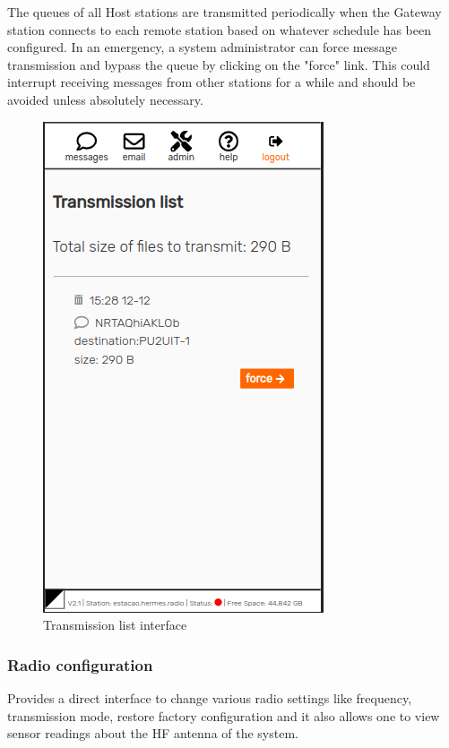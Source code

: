 \documentclass[11pt,a4paper]{article}
\begin{document}
The queues of all Host stations are transmitted periodically when the Gateway station connects to each remote station based on whatever schedule has been configured. In an emergency, a system administrator can force message transmission and bypass the queue by clicking on the "force" link. This could interrupt receiving messages from other stations for a while and should be avoided unless absolutely necessary.   
    \begin{figure}[H]
    \centering
    \includegraphics[width=0.5\columnwidth]{screenshots/frontend/en/transmission.png}
    \caption{Transmission list interface}
    \label{fig:transmission}
   
    \end{figure}    
    
    
\subsubsection{Radio configuration}
\label{gui_radio_config}

Provides a direct interface to change various radio settings like frequency, transmission mode, restore factory configuration and it also allows one to view sensor readings about the HF antenna of the system. %
\end{document}
